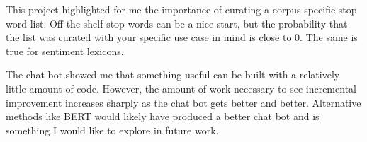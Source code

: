 \documentclass{article}
\begin{document}
This project highlighted for me the importance of curating a corpus-specific stop word list. Off-the-shelf stop words can be a nice start, but the probability that the list was curated with your specific use case in mind is close to 0. The same is true for sentiment lexicons. 

The chat bot showed me that something useful can be built with a relatively little amount of code. However, the amount of work necessary to see incremental improvement increases sharply as the chat bot gets better and better. Alternative methods like BERT would likely have produced a better chat bot and is something I would like to explore in future work. 



\end{document}
